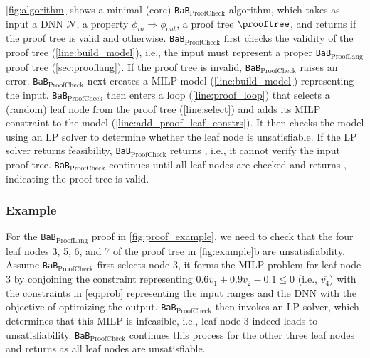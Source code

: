 \documentclass[oneside,11pt,dvipsnames]{book}
\numberwithin{equation}{section}
\theoremstyle{definition}
\theoremstyle{remark}
\newcommand{\tvn}[1]{\iftoggle{usecomment}{{\color{red}{[TVN]: #1}}}{}}
\newcommand{\hd}[1]{\iftoggle{usecomment}{{\color{blue}{[HD]: #1}}}{}}
\newcommand{\prooflang}{\texttt{BaB$_{\text{ProofLang}}$}}
\newcommand{\proofcheck}{\texttt{BaB$_{\text{ProofCheck}}$}}
\begin{document}
\autoref{fig:algorithm} shows a minimal (core)  \proofcheck{} algorithm, which takes as input a DNN $\mathcal{N}$, a property $\phi_{in} \Rightarrow \phi_{out}$, a proof tree $\prooftree$, and returns \certified if the proof tree is valid and \uncertified otherwise. 
\proofcheck{} first checks the validity of the proof tree (\autoref{line:build_model}), i.e., the input must represent a proper \prooflang{} proof tree (\autoref{sec:prooflang}).  
If the proof tree is invalid, \proofcheck{} raises an error.
\proofcheck{} next creates a MILP model (\autoref{line:build_model}) representing the input. %
\proofcheck{} then enters a loop (\autoref{line:proof_loop}) that selects a (random) leaf node from the proof tree (\autoref{line:select}) and adds its MILP constraint to the model (\autoref{line:add_proof_leaf_constrs}). It then checks the model using an LP solver to determine whether the leaf node is unsatisfiable. If the LP solver returns feasibility, \proofcheck{} returns \uncertified, i.e., it cannot verify the input proof tree. 
\proofcheck{} continues until all leaf nodes are checked and returns \certified, indicating the proof tree is valid.



\subsubsection{Example} For the \prooflang{} proof in \autoref{fig:proof_example}, we need to check that the four leaf nodes 3, 5, 6, and 7 of the proof tree in \autoref{fig:example}b are unsatisfiability. Assume \proofcheck{} first selects node 3, it forms the MILP problem for leaf node 3 by conjoining the constraint representing $0.6v_1 + 0.9v_2 - 0.1 \le 0$ (i.e., $\overline{v_4}$) %
with the constraints in \autoref{eq:prob} representing the input ranges and the DNN with the objective of optimizing the output. \proofcheck{} then invokes an LP solver, which determines that this MILP is infeasible, i.e., leaf node 3 indeed leads to unsatisfiability. \proofcheck{} continues this process for the other three leaf nodes and returns \certified as all leaf nodes are unsatisfiable.
\end{document}
